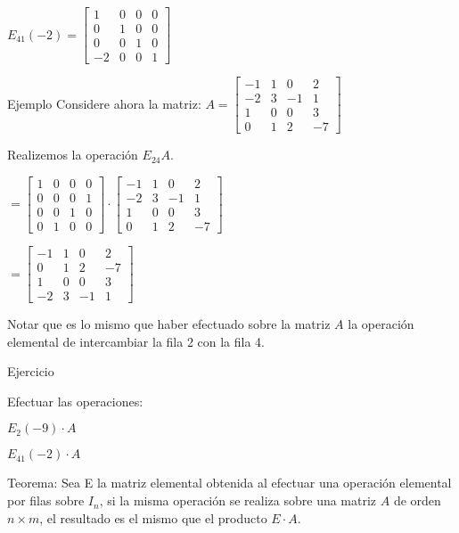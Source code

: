 $E_{41}(-2)=\begin{bmatrix}
1 &  0 & 0 & 0\\
0 &  1 & 0 & 0\\
0 &  0 & 1 & 0\\
-2 &  0 & 0 & 1
\end{bmatrix}
$


{Ejemplo}
Considere ahora la matriz:
$A=\begin{bmatrix}
-1 &  1 & 0 & 2\\
-2 &  3 & -1 & 1\\
 1 & 0  & 0 & 3\\
0 &  1 & 2 & -7
\end{bmatrix}
$

Realizemos  la operación $E_{24}A$.

$=\begin{bmatrix}
1 &  0 & 0 & 0\\
0 &  0 & 0 & 1\\
0 &  0 & 1 & 0\\
0 &  1 & 0 & 0
\end{bmatrix}
\cdot
\begin{bmatrix}
-1 &  1 & 0 & 2\\
-2 &  3 & -1 & 1\\
 1 & 0  & 0 & 3\\
0 &  1 & 2 & -7
\end{bmatrix}
$

$=\begin{bmatrix}
-1 &  1 & 0 & 2\\
0 &  1 & 2 & -7\\
 1 & 0  & 0 & 3\\
-2 &  3 & -1 & 1
\end{bmatrix}$

Notar que es lo mismo que haber efectuado sobre la matriz $A$ la operación elemental de intercambiar la fila 2 con la fila 4.


{Ejercicio}

Efectuar las operaciones:


$E_{2}(-9)\cdot A$


$E_{41}(-2)\cdot A$



\begin{block}{Teorema:}
Sea E la matriz elemental obtenida al efectuar una operación
elemental por filas sobre $I_n$, si la misma operación se realiza sobre
una matriz  $A$ de orden $n\times m$, el resultado es el mismo que el producto $E\cdot A$.
\end{block}


